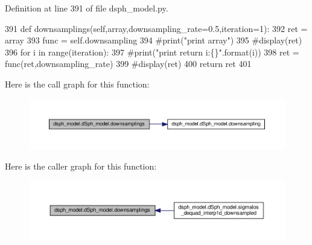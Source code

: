 Definition at line 391 of file dsph\+\_\+model.\+py.


\begin{DoxyCode}
391     \textcolor{keyword}{def }downsamplings(self,array,downsampling\_rate=0.5,iteration=1):
392         ret = array
393         func = self.downsampling
394         \textcolor{comment}{#print("print array")}
395         \textcolor{comment}{#display(ret)}
396         \textcolor{keywordflow}{for} i \textcolor{keywordflow}{in} range(iteration):
397             \textcolor{comment}{#print("print return i:\{\}".format(i))}
398             ret = func(ret,downsampling\_rate)
399             \textcolor{comment}{#display(ret)}
400         \textcolor{keywordflow}{return} ret
401     
\end{DoxyCode}
Here is the call graph for this function\+:\nopagebreak
\begin{figure}[H]
\begin{center}
\leavevmode
\includegraphics[width=350pt]{d0/d25/classdsph__model_1_1dSph__model_aa362ce682d90de77e755374efa153cf7_cgraph}
\end{center}
\end{figure}
Here is the caller graph for this function\+:\nopagebreak
\begin{figure}[H]
\begin{center}
\leavevmode
\includegraphics[width=350pt]{d0/d25/classdsph__model_1_1dSph__model_aa362ce682d90de77e755374efa153cf7_icgraph}
\end{center}
\end{figure}
\mbox{\label{classdsph__model_1_1dSph__model_a97bf665bdc2ff464da2c685f6f182088}} 
